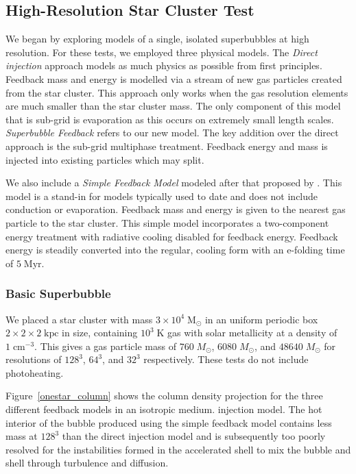 \subsection{High-Resolution Star Cluster Test}\label{cluster}
We began by exploring models of a single, isolated superbubbles at high
resolution.  For these tests, we employed three physical models.  The {\it
Direct injection} approach models as much physics as possible from first
principles.  Feedback mass and energy is modelled via a stream of new gas
particles created from the star cluster.  This approach only works when the gas
resolution elements are much smaller than the star cluster mass.  The only
component of this model that is sub-grid is evaporation as this occurs on
extremely small length scales.  {\it Superbubble Feedback} refers to our new
model.  The key addition over the direct approach is the sub-grid multiphase
treatment.  Feedback energy and mass is injected into existing particles which
may split.  

We also include a {\it Simple Feedback
Model} modeled after that proposed by \citet{Agertz2013}.  This model is a
stand-in for models typically used to date and does not include conduction or
evaporation.  Feedback mass and energy is given to the nearest gas particle to
the star cluster.  This simple model incorporates a two-component energy
treatment with radiative cooling disabled for feedback energy.  Feedback energy
is steadily converted into the regular, cooling form with an e-folding time of
$5\;\mathrm{Myr}$. 

\subsubsection{Basic Superbubble}

We placed a star cluster with mass $3\times10^4\;\mathrm{M_\odot}$ in an uniform
periodic box $2\times2\times2\;\mathrm{kpc}$ in size, containing
$10^3\;\mathrm{K}$ gas with solar metallicity at a density of
$1\;\mathrm{cm^{-3}}$.   This gives a gas particle mass of $760\; M_\odot$,
$6080\; M_\odot$, and $48640\; M_\odot$ for resolutions of $128^3$, $64^3$, and
$32^3$ respectively.  These tests do not include photoheating. 

Figure~\ref{onestar_column} shows the column density projection for the three
different feedback models in an isotropic medium.  injection model.   The hot
interior of the bubble produced using the simple feedback model contains less
mass at $128^3$ than the direct injection model and is subsequently too poorly
resolved for the instabilities formed in the accelerated shell
\citep{Vishniac1983} to mix the bubble and shell through turbulence and
diffusion.

